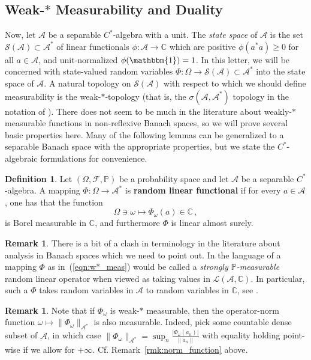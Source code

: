 \documentclass{article}
\newcommand{\one}{\mathbbm{1}}
\newcommand{\C}{\mathbb C}
\newcommand{\A}{\mathcal{A}}
\renewcommand{\P}{\mathbb{P}}
\newcommand{\<}{\langle}
\renewcommand{\>}{\rangle}
\theoremstyle{definition}
\newtheorem{define}[thm]{Definition}
\newtheorem{rmk}[thm]{Remark}
\numberwithin{equation}{section}
\begin{document}
    \subsection{Weak-$\ast$ Measurability and Duality}
    Now, let $\A$ be a separable $C^*$-algebra with a unit. The \emph{state space} of $\A$ is the set $\mathcal{S}(\A)\subset \A^*$ of linear functionals $\phi:\A \to \C$ which are positive $\phi(a^*a) \ge 0$ for all $a\in \A$, and unit-normalized $\phi(\one) = 1$. In this letter, we will be concerned with state-valued random variables $\Phi: \Omega \to \mathcal{S}(\A)\subset \mathcal{A}^*$ into the state space of $\A$. A natural topology on $\mathcal{S}(\A)$ with respect to which we should define measurability is the weak-$\ast$-topology (that is, the $\sigma(\mathcal{A}, \mathcal{A}^*)$ topology in the notation of \cite{ReedSimon}). There does not seem to be much in the literature about weakly-$\ast$ measurable functions in non-reflexive Banach spaces, so we will prove several basic properties here. Many of the following lemmas can be generalized to a separable Banach space with the appropriate properties, but we state the $C^*$-algebraic formulations for convenience. 

    \begin{define}
        Let $(\Omega, \mathcal{F}, \P)$ be a probability space and let $\A$ be a separable $C^*$-algebra. A mapping $\Phi:\Omega \to \A^*$ is \textbf{random linear functional} if for every $a\in \A$, one has that the function 
        \begin{equation}\label{eqn:w*_meas}
            \Omega \ni \omega \mapsto \Phi_\omega(a) \in \C\,,
        \end{equation} is Borel measurable in $\C$, and furthermore $\Phi$ is linear almost surely. 
    \end{define}
\begin{rmk}\label{rmk:composition_of_random_variables}
    There is a bit of a clash in terminology in the literature about analysis in Banach spaces which we need to point out. In the language of \cite{Bharucha-Reid, Hytonen_et_al_vol1, Hytonen_et_al_vol2, Hytonen_et_al_vol3} a mapping $\Phi$ as in~(\ref{eqn:w*_meas}) would be called a \emph{strongly $\P$-measurable} random linear operator when viewed as taking values in $\mathscr{L}(\A, \C)$. In particular, such a $\Phi$ takes random variables in $\A$ to random variables in $\C$, see \cite[Theorem 2.14]{Bharucha-Reid}. 
\end{rmk}

\begin{rmk}
    Note that if $\Phi_\omega$ is weak-$\ast$ measurable, then the operator-norm function $\omega\mapsto \|\Phi_\omega\|_{\A^*}$ is also measurable. Indeed, pick some countable dense subset of $\A$, in which case $\|\Phi_\omega\|_{\A^*} = \sup_n \frac{|\Phi_\omega(a_n)|}{\|a_n\|}$ with equality holding point-wise if we allow for $+\infty$. Cf. Remark~\ref{rmk:norm_function} above. 
\end{rmk}
\end{document}
